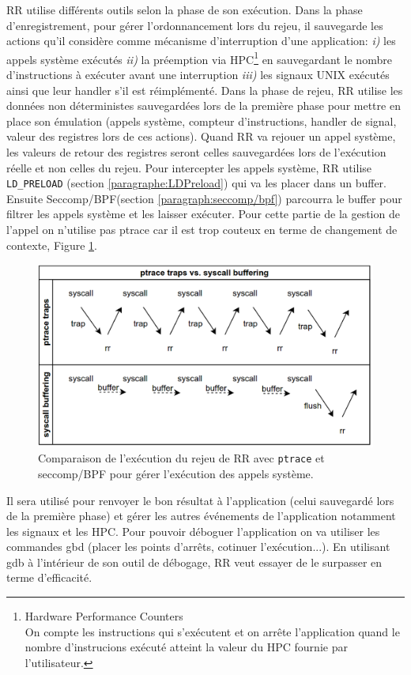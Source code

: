 RR utilise différents outils selon la phase de son
exécution\citep{RRimplem}. Dans la phase d'enregistrement, pour gérer
l'ordonnancement lors du rejeu, il sauvegarde les actions qu'il considère comme
mécanisme d'interruption d'une application: \textit{i)} les appels système
exécutés \textit{ii)} la préemption via HPC\footnote{Hardware Performance
  Counters \\ On compte les instructions qui s'exécutent et on arrête
  l'application quand le nombre d'instrucions exécuté atteint la valeur du HPC
  fournie par l'utilisateur.} en sauvegardant le nombre d'instructions à exécuter
avant une interruption \textit{iii)} les signaux UNIX exécutés ainsi que leur
handler s'il est réimplémenté. Dans la phase de rejeu, RR utilise les données
non déterministes sauvegardées lors de la première phase pour mettre en place
son émulation (appels système, compteur d'instructions, handler de signal,
valeur des registres lors de ces actions). Quand RR va rejouer un appel système,
les valeurs de retour des registres seront celles sauvegardées lors de
l'exécution réelle et non celles du rejeu. Pour intercepter les appels système,
RR utilise \texttt{LD\_PRELOAD} (section \ref{paragraphe:LDPreload}) qui va les
placer dans un buffer. Ensuite Seccomp/BPF(section \ref{paragraph:seccomp/bpf})
parcourra le buffer pour filtrer les appels système et les laisser
exécuter. Pour cette partie de la gestion de l'appel on n'utilise pas ptrace car
il est trop couteux en terme de changement de contexte, Figure \ref{AS_RR}.
\begin{figure}
\centering \includegraphics[scale=0.30]{Pictures/png/RR_AS}
\caption{Comparaison de l'exécution du rejeu de RR avec \texttt{ptrace} et seccomp/BPF
  pour gérer l'exécution des appels système.}
\label{AS_RR}
\end{figure}
Il sera utilisé pour renvoyer le bon résultat à l'application (celui sauvegardé
lors de la première phase) et gérer les autres événements de l'application
notamment les signaux et les HPC. Pour pouvoir déboguer l'application on va
utiliser les commandes gbd (placer les points d'arrêts, cotinuer
l'exécution...). En utilisant gdb à l'intérieur de son outil de débogage, RR
veut essayer de le surpasser en terme d'efficacité.


